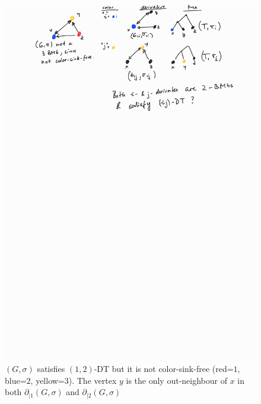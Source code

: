 \documentclass[final,3p,times]{elsarticle}
\begin{document}
\begin{figure}[ht]
  \centering
    \includegraphics[width=16cm]{figures/sink_free_marc_ex.jpg}
    \caption{$(G,\sigma)$ satisfies $(1,2)$-DT but it is not color-sink-free (red=$1$, blue=$2$, yellow=$3$). The vertex $y$ is the only out-neighbour of $x$ in both $\partial_{|1}(G,\sigma)$ and $\partial_{|2}(G,\sigma)$}
    \label{fig:different_trees}
\end{figure}
\end{document}
